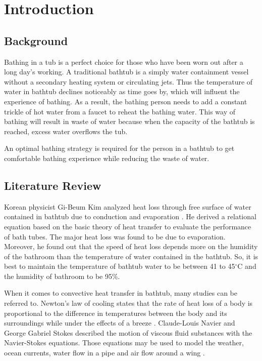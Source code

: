\section{Introduction}

\subsection{Background}

Bathing in a tub is a perfect choice for those who have been worn out after a long day's working. A traditional bathtub is a simply water containment vessel without a secondary heating system or circulating jets. Thus the temperature of water in bathtub declines noticeably as time goes by, which will influent the experience of bathing. As a result, the bathing person needs to add a constant trickle of hot water from a faucet to reheat the bathing water. This way of bathing will result in waste of water because when the capacity of the bathtub is reached, excess water overflows the tub.

An optimal bathing strategy is required for the person in a bathtub to get comfortable bathing experience while reducing the waste of water.

\subsection{Literature Review}

Korean physicist Gi-Beum Kim analyzed heat loss through free surface of water contained in bathtub due to conduction and evaporation \cite{1}. He derived a relational equation based on the basic theory of heat transfer to evaluate the performance of bath tubes. The major heat loss was found to be due to evaporation. Moreover, he found out that the speed of heat loss depends more on the humidity of the bathroom than the temperature of water contained in the bathtub. So, it is best to maintain the temperature of bathtub water to be between 41 to 45$^{\circ}$C and the humidity of bathroom to be 95\%.

When it comes to convective heat transfer in bathtub, many studies can be referred to. Newton's law of cooling states that the rate of heat loss of a body is proportional to the difference in temperatures between the body and its surroundings while under the effects of a breeze \cite{2}. Claude-Louis Navier and George Gabriel Stokes described the motion of viscous fluid substances with the Navier-Stokes equations. Those equations may be used to model the weather, ocean currents, water flow in a pipe and air flow around a wing \cite{3}.


